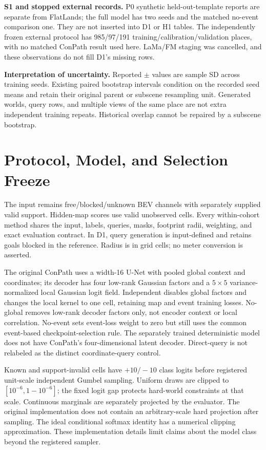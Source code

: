 \documentclass[conference,letterpaper,10pt,onecolumn]{IEEEtran}
\begin{document}
\textbf{S1 and stopped external records.} P0 synthetic held-out-template reports are separate from FlatLands; the full model has two seeds and the matched no-event comparison one. They are not inserted into D1 or H1 tables. The independently frozen external protocol has 985/97/191 training/calibration/validation places, with no matched ConPath result used here. LaMa/FM staging was cancelled, and these observations do not fill D1's missing rows.

\textbf{Interpretation of uncertainty.} Reported $\pm$ values are sample SD across training seeds. Existing paired bootstrap intervals condition on the recorded seed means and retain their original parent or subscene resampling unit. Generated worlds, query rows, and multiple views of the same place are not extra independent training repeats. Historical overlap cannot be repaired by a subscene bootstrap.

\section{Protocol, Model, and Selection Freeze}
The input remains free/blocked/unknown BEV channels with separately supplied valid support. Hidden-map scores use valid unobserved cells. Every within-cohort method shares the input, labels, queries, masks, footprint radii, weighting, and exact evaluation contract. In D1, query generation is input-defined and retains goals blocked in the reference. Radius is in grid cells; no meter conversion is asserted.

The original ConPath uses a width-16 U-Net with pooled global context and coordinates; its decoder has four low-rank Gaussian factors and a $5\times5$ variance-normalized local Gaussian logit field. Independent disables global factors and changes the local kernel to one cell, retaining map and event training losses. No-global removes low-rank decoder factors only, not encoder context or local correlation. No-event sets event-loss weight to zero but still uses the common event-based checkpoint-selection rule. The separately trained deterministic model does not have ConPath's four-dimensional latent decoder. Direct-query is not relabeled as the distinct coordinate-query control.

Known and support-invalid cells have $+10/-10$ class logits before registered unit-scale independent Gumbel sampling. Uniform draws are clipped to $[10^{-6},1-10^{-6}]$; the fixed logit gap protects hard-world constraints at that scale. Continuous marginals are separately projected by the evaluator. The original implementation does not contain an arbitrary-scale hard projection after sampling. The ideal conditional softmax identity has a numerical clipping approximation. These implementation details limit claims about the model class beyond the registered sampler.
\end{document}
